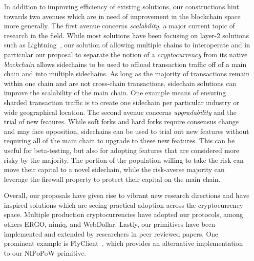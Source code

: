 In addition to improving efficiency of existing solutions, our constructions
hint towards two avenues which are in need of improvement in the blockchain
space more generally. The first avenue concerns \emph{scalability}, a major
current topic of research in the field. While most solutions have been focusing
on layer-2 solutions such as Lightning~\cite{lightning}, our solution of
allowing multiple chains to interoperate and in particular our proposal to
separate the notion of a \emph{cryptocurrency} from its native \emph{blockchain}
allows sidechains to be used to offload transaction traffic off of a main chain
and into multiple sidechains. As long as the majority of transactions remain
within one chain and are not cross-chain transactions, sidechain solutions can
improve the scalability of the main chain. One example means of ensuring sharded
transaction traffic is to create one sidechain per particular industry or
wide geographical location. The second avenue concerns \emph{upgradability} and
the trial of new features. While soft forks and hard forks require consensus
change and may face opposition, sidechains can be used to trial out new features
without requiring all of the main chain to upgrade to these new features. This
can be useful for beta-testing, but also for adopting features that are
considered more risky by the majority. The portion of the population willing to
take the risk can move their capital to a novel sidechain, while the risk-averse
majority can leverage the firewall property to protect their capital on the main
chain.

Overall, our proposals have given rise to vibrant new research directions and
have inspired solutions which are seeing practical adoption across the
cryptocurrency space. Multiple production cryptocurrencies have adopted our
protocols, among others ERGO, nimiq, and WebDollar. Lastly, our primitives have
been implemented and extended by researchers in peer reviewed papers. One
prominent example is FlyClient~\cite{flyclient}, which provides an alternative
implementation to our NIPoPoW primitive.



